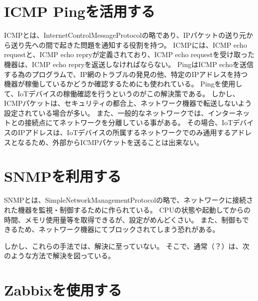 \section{ICMP Pingを活用する}
ICMPとは、InternetControlMessageProtocolの略であり、IPパケットの送り元から送り先への間で起きた問題を通知する役割を持つ。
ICMPには、ICMP echo requestと、ICMP echo repryが定義されており、ICMP echo requestを受け取った機器は、ICMP echo repryを返送しなければならない。
PingはICMP echoを送信する為のプログラムで、IP網のトラブルの発見の他、特定のIPアドレスを持つ機器が稼働しているかどうか確認するためにも使われている。
Pingを使用して、IoTデバイスの稼働確認を行うというのがこの解決策である。
しかし、ICMPパケットは、セキュリティの都合上、ネットワーク機器で転送しないよう設定されている場合が多い。
また、一般的なネットワークでは、インターネットとの接続点にてネットワークを分離している事がある。
その場合、IoTデバイスのIPアドレスは、IoTデバイスの所属するネットワークでのみ通用するアドレスとなるため、外部からICMPパケットを送ることは出来ない。

\begin{comment}
NAPTとは、NetworkAddressPortTranslationの略で、外部のネットワークと内部のネットワークを分離する機能を持つ。
そのため、デバイス管理者から送信された
具体的には、内側から外側へデータを送信する際、送信元IPアドレスとポート番号を機器のIPアドレスとポート番号に変換・記憶し、
外部から内部へデータの送信があった場合、記憶していたIPアドレスとポート番号から、送信先IPアドレスとポートを書き換え、内部へ転送する
そのため、内側から始る通信は問題ないが、外側から始まる通信はブロックしてしまう。
\end{comment}

\section{SNMPを利用する}
SNMPとは、SimpleNetworkManagementProtocolの略で、ネットワークに接続された機器を監視・制御するために作られている。
CPUの状態や起動してからの時間、メモリ使用量等を取得できるが、設定がめんどくさい。
また、制御もできるため、ネットワーク機器にてブロックされてしまう恐れがある。


しかし、これらの手法では、解決に至っていない。
そこで、通常（？）は、次のような方法で解決を図っている。
\section{Zabbixを使用する}

